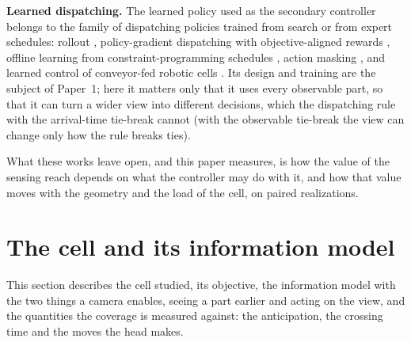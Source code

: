 \documentclass[11pt,a4paper]{article}
\begin{document}
\textbf{Learned dispatching.} The learned policy used as the secondary controller
belongs to the family of dispatching policies trained from search or from expert
schedules: rollout \cite{M02_Bertsekas1997}, policy-gradient dispatching with
objective-aligned rewards \cite{S19_Zhang2020,S21_Sun2023}, offline learning from
constraint-programming schedules \cite{S20_VanRemmerden2025}, action masking
\cite{M04_Huang2022,S18_Wei2024}, and learned control of conveyor-fed robotic cells
\cite{S15_Zisgen2025,S16_Drijver2023,S17_Drakaki2017,S12_Wang2004,S13_Li2020}. Its
design and training are the subject of Paper~1; here it matters only that it uses every
observable part, so that it can turn a wider view into different decisions, which the
dispatching rule with the arrival-time tie-break cannot (with the observable tie-break the
view can change only how the rule breaks ties).

What these works leave open, and this paper measures, is how the value of the sensing
reach depends on what the controller may do with it, and how that value moves with the
geometry and the load of the cell, on paired realizations.

\section{The cell and its information model}\label{sec:cell}

This section describes the cell studied, its objective, the information model with the two things a camera enables, seeing a part earlier and acting on the view, and the quantities the coverage is measured against: the anticipation, the crossing time and the moves the head makes.
\end{document}
